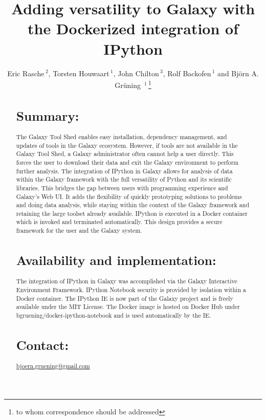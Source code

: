 \documentclass{bioinfo}
\begin{document}

\title[short Title]{Adding versatility to Galaxy with the Dockerized integration of IPython}
\author[Sample \textit{et~al}]{Eric Rasche\,$^{2}$, Torsten Houwaart\,$^{1}$, John Chilton\,$^{3}$, Rolf Backofen\,$^{1}$ and Bj\"orn A. Gr\"uning \,$^{1}$\,\footnote{to whom correspondence should be addressed}}
\address{$^{1}$Bioinformatics Group, Department of Computer Science, University of Freiburg\\
$^{2}$Center for Phage Technology, Texas A\&M University\\
$^{3}$Department of Biochemistry and Molecular Biology, Penn State University}




\maketitle

\begin{abstract}

\section{Summary:}
The Galaxy Tool Shed enables easy installation, dependency management, and updates of tools in the Galaxy ecosystem. 
However, if tools are not available in the Galaxy Tool Shed, a Galaxy administrator often cannot help a user directly. 
This forces the user to download their data and exit the Galaxy environment to perform further analysis. The integration of 
IPython in Galaxy allows for analysis of data within the Galaxy framework with the full versatility of Python and its 
scientific libraries. This bridges the gap between users with programming experience and Galaxy's Web UI. It adds the flexibility 
of quickly prototyping solutions to problems and doing data analysis, while staying within the context of the Galaxy 
framework and retaining the large toolset already available. IPython is executed in a Docker container which is 
invoked and terminated automatically. This design provides a secure framework for the user and the Galaxy system.


\section{Availability and implementation:}
The integration of IPython in Galaxy was accomplished via the Galaxy Interactive Environment Framework. 
IPython Notebook security is provided by isolation within a Docker container. The IPython IE
is now part of the Galaxy project and is freely available under the MIT License. The Docker image is hosted on Docker Hub under bgruening/docker-ipython-notebook and is used automatically by the IE.

\section{Contact:} \href{bjoern.gruening@gmail.com}{bjoern.gruening@gmail.com}
\end{abstract}
\end{document}
